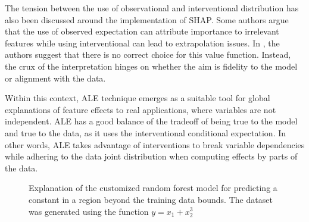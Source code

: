 The tension between the use of observational and interventional distribution has also been discussed around the implementation of \gls{SHAP}. Some authors argue that the use of observed expectation can attribute importance to irrelevant features \cite{Janzing2020FeatureProblem, Sundararajan2020TheExplanation} while using interventional can lead to extrapolation issues. In \cite{Chen2020TrueData}, the authors suggest that there is no correct choice for this value function. Instead, the crux of the interpretation hinges on whether the aim is fidelity to the model or alignment with the data.

Within this context, \gls{ALE} technique emerges as a suitable tool for global explanations of feature effects to real applications, where variables are not independent. \gls{ALE} has a good balance of the tradeoff of being true to the model and true to the data, as it uses the interventional conditional expectation. In other words, \gls{ALE} takes advantage of interventions to break variable dependencies while adhering to the data joint distribution when computing effects by parts of the data.

\begin{figure}[ht!]
\centering
  \caption{Explanation of the customized random forest model for predicting a constant in a region beyond the training data bounds. The dataset was generated using the function $y = x_1 + x_2^3$}
    \label{fig:extrapolation_rf}
\end{figure}

